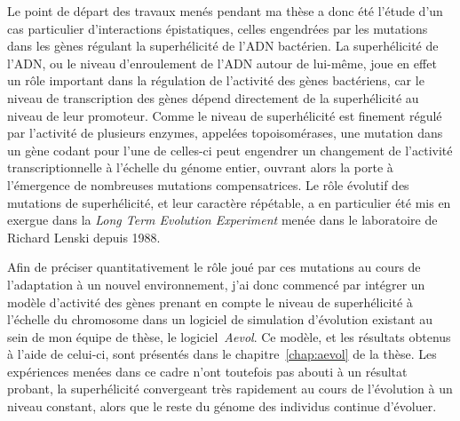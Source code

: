 Le point de départ des travaux menés pendant ma thèse a donc été l'étude d'un cas particulier d'interactions épistatiques, celles engendrées par les mutations dans les gènes régulant la superhélicité de l'ADN bactérien.
La superhélicité de l'ADN, ou le niveau d'enroulement de l'ADN autour de lui-même, joue en effet un rôle important dans la régulation de l'activité des gènes bactériens, car le niveau de transcription des gènes dépend directement de la superhélicité au niveau de leur promoteur.
Comme le niveau de superhélicité est finement régulé par l'activité de plusieurs enzymes, appelées topoisomérases, une mutation dans un gène codant pour l'une de celles-ci peut engendrer un changement de l'activité transcriptionnelle à l'échelle du génome entier,
ouvrant alors la porte à l'émergence de nombreuses mutations compensatrices.
Le rôle évolutif des mutations de superhélicité, et leur caractère répétable, a en particulier été mis en exergue dans la \emph{Long Term Evolution Experiment} menée dans le laboratoire de Richard Lenski depuis 1988.

Afin de préciser quantitativement le rôle joué par ces mutations au cours de l'adaptation à un nouvel environnement, j'ai donc commencé par intégrer un modèle d'activité des gènes prenant en compte le niveau de superhélicité à l'échelle du chromosome dans un logiciel de simulation d'évolution existant au sein de mon équipe de thèse, le logiciel \emph{Aevol}.
Ce modèle, et les résultats obtenus à l'aide de celui-ci, sont présentés dans le chapitre~\ref{chap:aevol} de la thèse.
Les expériences menées dans ce cadre n'ont toutefois pas abouti à un résultat probant, la superhélicité convergeant très rapidement au cours de l'évolution à un niveau constant, alors que le reste du génome des individus continue d'évoluer.



